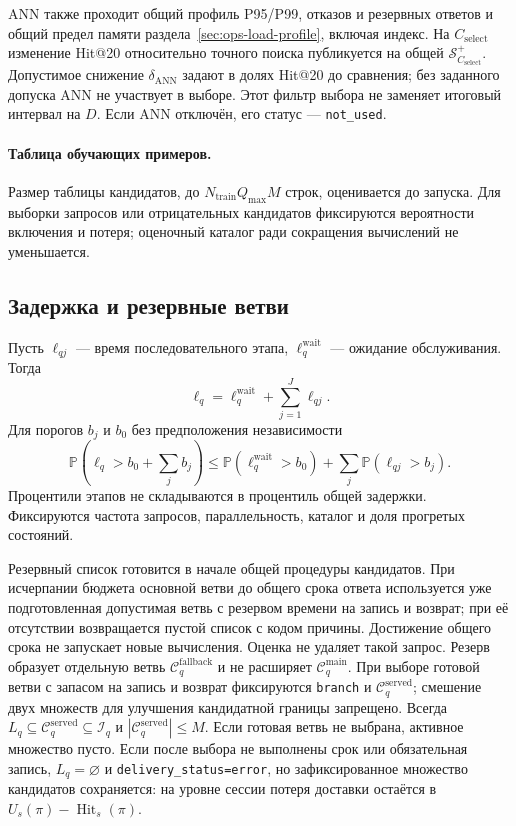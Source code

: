 \documentclass[12pt,a4paper]{article}
\newcommand{\code}[1]{{\ttfamily\small\nolinkurl{#1}}}
\newcommand{\Prob}{\mathbb P}
\theoremstyle{plainru}
\begin{document}
ANN также проходит общий профиль P95/P99, отказов и резервных ответов
и общий предел памяти раздела~\ref{sec:ops-load-profile}, включая индекс.
На $C_{\mathrm{select}}$ изменение Hit@20 относительно точного поиска
публикуется на общей $\mathcal S_{C_{\mathrm{select}}}^+$.
Допустимое снижение $\delta_{\mathrm{ANN}}$ задают в долях Hit@20
до сравнения; без заданного допуска ANN не участвует в выборе.
Этот фильтр выбора не заменяет итоговый интервал на $D$.
Если ANN отключён, его статус --- \code{not_used}.

\paragraph{Таблица обучающих примеров.}
Размер таблицы кандидатов, до \(N_{\mathrm{train}}Q_{\max}M\) строк,
оценивается до запуска. Для выборки запросов или отрицательных кандидатов
фиксируются вероятности включения и потеря; оценочный каталог
ради сокращения вычислений не уменьшается.

\subsection{Задержка и резервные ветви}
\label{sec:ops-deadlines}

Пусть \(\ell_{qj}\) --- время последовательного этапа,
\(\ell_q^{\mathrm{wait}}\) --- ожидание обслуживания. Тогда
\begin{equation}\label{eq:ops-latency}
\ell_q=\ell_q^{\mathrm{wait}}+\sum_{j=1}^{J}\ell_{qj}.
\end{equation}
Для порогов \(b_j\) и \(b_0\) без предположения независимости
\begin{equation}\label{eq:ops-latency-bound}
\Prob\!\left(\ell_q>b_0+\sum_j b_j\right)
\le \Prob(\ell_q^{\mathrm{wait}}>b_0)+\sum_j\Prob(\ell_{qj}>b_j).
\end{equation}
Процентили этапов не складываются в процентиль общей задержки.
Фиксируются частота запросов, параллельность, каталог и доля прогретых состояний.

Резервный список готовится в начале общей процедуры кандидатов.
При исчерпании бюджета основной ветви до общего срока ответа
используется уже подготовленная допустимая ветвь с резервом времени
на запись и возврат; при её отсутствии возвращается пустой список
с кодом причины. Достижение общего срока не запускает новые вычисления.
Оценка не удаляет такой запрос. Резерв образует отдельную ветвь
$\mathcal C_q^{\mathrm{fallback}}$ и не расширяет
$\mathcal C_q^{\mathrm{main}}$. При выборе готовой ветви с запасом
на запись и возврат фиксируются \code{branch} и
$\mathcal C_q^{\mathrm{served}}$; смешение двух множеств
для улучшения кандидатной границы запрещено. Всегда
$L_q\subseteq\mathcal C_q^{\mathrm{served}}\subseteq\mathcal I_q$
и $|\mathcal C_q^{\mathrm{served}}|\le M$. Если готовая ветвь
не выбрана, активное множество пусто. Если после выбора не выполнены
срок или обязательная запись, $L_q=\varnothing$ и
\code{delivery_status=error}, но зафиксированное множество кандидатов
сохраняется: на уровне сессии потеря доставки остаётся в
$U_s(\pi)-\operatorname{Hit}_s(\pi)$.
\end{document}
